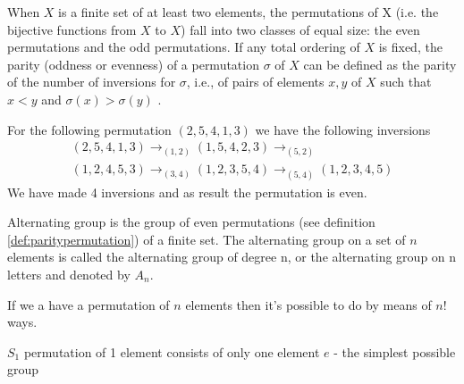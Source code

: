 \begin{appendices}
\begin{definition}
  When $X$ is a finite set of at least two elements, the permutations of
  X (i.e. the bijective functions from $X$ to $X$) fall into two classes
  of equal size: the even permutations and the odd permutations. If
  any total ordering of $X$ is fixed, the parity (oddness or evenness)
  of a permutation $\sigma$ of $X$ can be defined as the
  parity of the number of inversions for $\sigma$, i.e., of pairs of elements
  $x, y$ of $X$ such that $x < y$ and $\sigma (x) > \sigma (y)$
  \cite{wiki:paritypermutation}.
  \label{def:paritypermutation}
\end{definition}

\begin{example}
  For the following permutation $(2,5,4,1,3)$ we have the following
  inversions
  \begin{eqnarray}
    (2,5,4,1,3) \to_{(1,2)}
    (1,5,4,2,3) \to_{(5,2)}
    \nonumber \\
    (1,2,4,5,3) \to_{(3,4)}
    (1,2,3,5,4) \to_{(5,4)}
    (1,2,3,4,5)
    \nonumber
  \end{eqnarray}
  We have made 4 inversions and as result the permutation is even.
  \label{ex:paritypermutation}
\end{example}

\begin{definition}
  Alternating group \cite{wiki:alteringgroup} is the group of even
  permutations (see definition \ref{def:paritypermutation}) of a finite 
  set. The alternating group on a set of $n$ elements is called the
  alternating group of degree n, or the alternating group on n letters
  and denoted by $A_n$.
  \label{def:alternatinggroup}
\end{definition}

\begin{example}[$S_n$ group]
  If we a have a permutation of $n$ elements then it's possible to do
  by means of $n!$ ways.
  \label{ex:sngroup}
\end{example}

\begin{example}[$S_1$ group]
  $S_1$ permutation of 1 element consists of only one element $e$ -
  the simplest possible group
  \label{ex:s1group}
\end{example}


\end{appendices}
